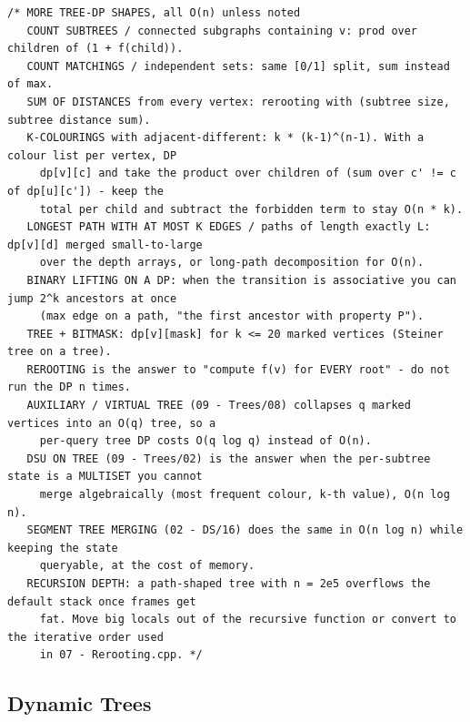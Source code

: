 \documentclass[9pt,a4paper,twocolumn]{extarticle}
\begin{document}
\begin{lstlisting}
/* MORE TREE-DP SHAPES, all O(n) unless noted
   COUNT SUBTREES / connected subgraphs containing v: prod over children of (1 + f(child)).
   COUNT MATCHINGS / independent sets: same [0/1] split, sum instead of max.
   SUM OF DISTANCES from every vertex: rerooting with (subtree size, subtree distance sum).
   K-COLOURINGS with adjacent-different: k * (k-1)^(n-1). With a colour list per vertex, DP
     dp[v][c] and take the product over children of (sum over c' != c of dp[u][c']) - keep the
     total per child and subtract the forbidden term to stay O(n * k).
   LONGEST PATH WITH AT MOST K EDGES / paths of length exactly L: dp[v][d] merged small-to-large
     over the depth arrays, or long-path decomposition for O(n).
   BINARY LIFTING ON A DP: when the transition is associative you can jump 2^k ancestors at once
     (max edge on a path, "the first ancestor with property P").
   TREE + BITMASK: dp[v][mask] for k <= 20 marked vertices (Steiner tree on a tree).
   REROOTING is the answer to "compute f(v) for EVERY root" - do not run the DP n times.
   AUXILIARY / VIRTUAL TREE (09 - Trees/08) collapses q marked vertices into an O(q) tree, so a
     per-query tree DP costs O(q log q) instead of O(n).
   DSU ON TREE (09 - Trees/02) is the answer when the per-subtree state is a MULTISET you cannot
     merge algebraically (most frequent colour, k-th value), O(n log n).
   SEGMENT TREE MERGING (02 - DS/16) does the same in O(n log n) while keeping the state
     queryable, at the cost of memory.
   RECURSION DEPTH: a path-shaped tree with n = 2e5 overflows the default stack once frames get
     fat. Move big locals out of the recursive function or convert to the iterative order used
     in 07 - Rerooting.cpp. */
\end{lstlisting}

\subsection{Dynamic Trees}

\filbreak
\end{document}
